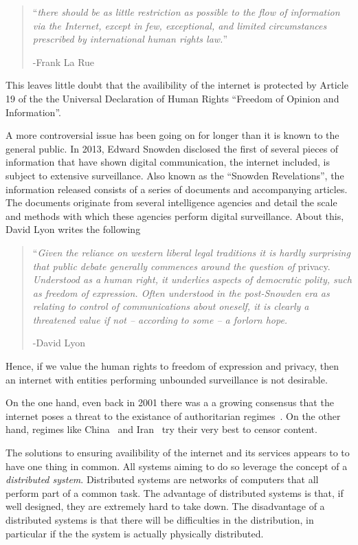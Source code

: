 \documentclass[a4paper,11pt]{book}
\theoremstyle{definition}
\begin{document}
\begin{quote}
    ``\textit{there should be as little restriction as possible  to  the  flow  of  information  via  the  Internet,
    except  in  few,  exceptional,  and  limited  circumstances  prescribed  by  international  human  rights  law.}'' 
    
    -Frank La Rue  
\end{quote}

This leaves little doubt that the availibility of the internet is protected by Article 19 of the
the Universal Declaration of Human Rights ``Freedom of Opinion and Information''.

A more controversial issue has been going on for longer than it is known to the general public.
In 2013, Edward Snowden disclosed the first of several pieces of information that
have shown digital communication, the internet included, is subject to extensive surveillance.
Also known as the ``Snowden Revelations'', the information released consists of a series
of documents and accompanying articles. The documents originate from several intelligence 
agencies and detail the scale and methods with which these agencies perform digital
surveillance. 
About this, David Lyon writes the following~\cite{lyon2014surveillance}

\begin{quote}
    ``\textit{Given the reliance on western liberal legal traditions
    it is hardly surprising that public debate generally 
    commences around the question of} privacy. 
    \textit{Understood as a human right, it underlies aspects of democratic polity,
    such as freedom of expression. 
    Often understood in the post-Snowden era as relating to 
    control of communications about oneself, 
    it is clearly a threatened value if not – according to some – a forlorn hope.}

    -David Lyon
\end{quote}

Hence, if we value the human rights to freedom of expression and privacy, then an internet
with entities performing unbounded surveillance is not desirable. 

On the one hand, even back in 2001 there was a a growing consensus that the internet poses
a threat to the existance of authoritarian regimes~\cite{kalathil2001internet}. 
On the other hand, regimes like China~\cite{endeshaw2004internet} and Iran~\cite{kimppa2010emancipatory}
try their very best to censor content. 

The solutions to ensuring availibility of the internet and its services
appears to to have one thing in common. All systems aiming to do so leverage the concept of
a \emph{distributed system}. Distributed systems are networks of computers that all perform part
of a common task. The advantage of distributed systems is that, if well designed, they are
extremely hard to take down. The disadvantage of a distributed systems is that there will
be difficulties in the distribution, in particular if the the system is actually physically
distributed. 
\end{document}
